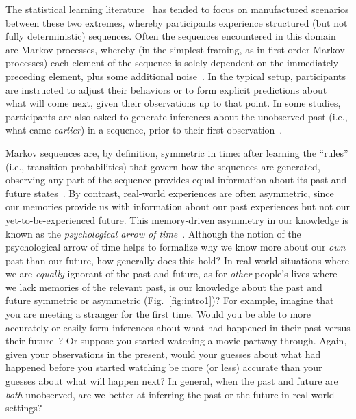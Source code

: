 \documentclass[10pt]{article}
\begin{document}
The statistical learning literature~\citep{SchaTurk15, Hass17, MaheEtal22} has tended to focus on manufactured scenarios between these two extremes, whereby participants experience structured (but not fully deterministic) sequences.  Often the sequences encountered in this domain are Markov processes, whereby (in the simplest framing, as in first-order Markov processes) each element of the sequence is solely dependent on the immediately preceding element, plus some additional noise~\citep{McNeEtal06, CuniEtal09, FurlEtal11, DaikEtal14, DaikEtal15, KoelEtal16, JonePash07, TummEtal16}.  In the typical setup, participants are instructed to adjust their behaviors or to form explicit predictions about what will come next, given their observations up to that point.  In some studies, participants are also asked to generate inferences about the unobserved past (i.e., what came \textit{earlier}) in a sequence, prior to their first observation~\citep{JonePash07}.

Markov sequences are, by definition, symmetric in time: after learning the ``rules'' (i.e., transition probabilities) that govern how the sequences are generated, observing any part of the sequence provides equal information about its past and future states~\citep{Cove94, BialEtal01, ElliEtal09}.  By contrast, real-world experiences are often asymmetric, since our memories provide us with information about our past experiences but not our yet-to-be-experienced future.  This memory-driven asymmetry in our knowledge is known as the \textit{psychological arrow of time}~\citep[e.g.,][]{Hawk85}.  Although the notion of the psychological arrow of time helps to formalize why we know more about our \textit{own} past than our future, how generally does this hold?  In real-world situations where we are \textit{equally} ignorant of the past and future, as for \textit{other} people's lives where we lack memories of the relevant past, is our knowledge about the past and future symmetric or asymmetric (Fig.~\ref{fig:intro1})?  For example, imagine that you are meeting a stranger for the first time.  Would you be able to more accurately or easily form inferences about what had happened in their past versus their future~\citep{TamiThor18, KostSaxe13}?  Or suppose you started watching a movie partway through.  Again, given your observations in the present, would your guesses about what had happened before you started watching be more (or less) accurate than your guesses about what will happen next?  In general, when the past and future are \textit{both} unobserved, are we better at inferring the past or the future in real-world settings?
\end{document}

